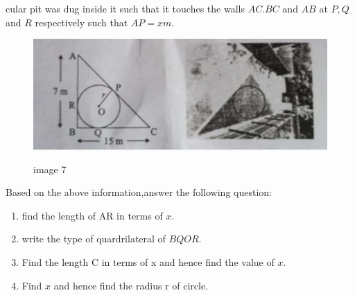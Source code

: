 \begin{enumerate}
cular pit was dug inside it such that it touches the walls $AC. BC$ and $AB$ at $P, Q$ and $R$ respectively such that $AP=xm$.
\begin{figure}[!ht]
\centering
\includegraphics[width=\columnwidth]{figs/g5.jpg}
\label{fig:image 7}
\caption{image 7}
\end{figure}
\text Based on the above information,answer the following question:\
\begin{enumerate}  
\item find the length of AR in terms of $x$.\ 
\item write the type of quardrilateral of $BQOR$.\ 
\item Find the length C in terms of x and hence find the value of $x$.\
\item Find $x$ and hence find the radius r of circle.
\end{enumerate}

\end{enumerate}
